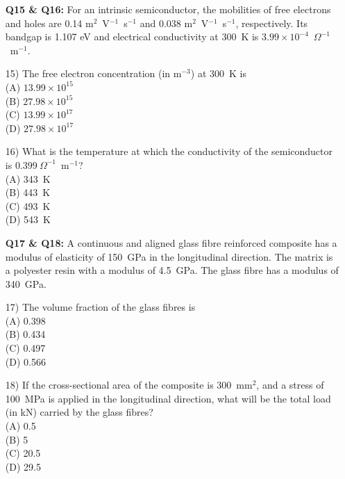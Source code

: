 \documentclass[journal,12pt,onecolumn]{IEEEtran}
\begin{document}
\begin{enumerate}
\item[\textbf{Q15 \& Q16:}] For an intrinsic semiconductor, the mobilities of free electrons and holes are 0.14 m$^2$~V$^{-1}$~s$^{-1}$ and 0.038 m$^2$~V$^{-1}$~s$^{-1}$, respectively. Its bandgap is 1.107 eV and electrical conductivity at 300~K is $3.99 \times 10^{-4}$~$\Omega^{-1}$~m$^{-1}$.
\vspace{0.5cm}

\item[15)] The free electron concentration (in m$^{-3}$) at 300~K is
\vspace{0.2cm}
\hfill{}\\
(A) $13.99 \times 10^{15}$ \\
(B) $27.98 \times 10^{15}$ \\
(C) $13.99 \times 10^{17}$ \\
(D) $27.98 \times 10^{17}$
\vspace{0.5cm}

\item[16)] What is the temperature at which the conductivity of the semiconductor is $0.399~\Omega^{-1}$~m$^{-1}$?
\vspace{0.2cm}
\hfill{}\\
(A) 343~K \\
(B) 443~K \\
(C) 493~K \\
(D) 543~K
\vspace{0.5cm}

\item[\textbf{Q17 \& Q18:}] A continuous and aligned glass fibre reinforced composite has a modulus of elasticity of 150~GPa in the longitudinal direction. The matrix is a polyester resin with a modulus of 4.5~GPa. The glass fibre has a modulus of 340~GPa.
\vspace{0.5cm}

\item[17)] The volume fraction of the glass fibres is
\vspace{0.2cm}
\hfill{}\\
(A) 0.398 \\
(B) 0.434 \\
(C) 0.497 \\
(D) 0.566
\vspace{0.5cm}

\item[18)] If the cross-sectional area of the composite is 300~mm$^2$, and a stress of 100~MPa is applied in the longitudinal direction, what will be the total load (in kN) carried by the glass fibres?
\hfill{}\\
(A) 0.5 \\
(B) 5 \\
(C) 20.5 \\
(D) 29.5
\vspace{0.5cm}


\end{enumerate}
\end{document}
